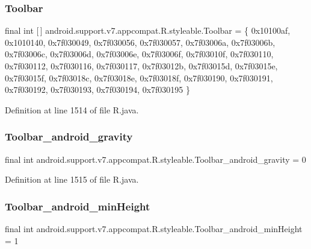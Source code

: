 \subsubsection{\texorpdfstring{Toolbar}{Toolbar}}
{\footnotesize\ttfamily final int \mbox{[}$\,$\mbox{]} android.\+support.\+v7.\+appcompat.\+R.\+styleable.\+Toolbar = \{ 0x10100af, 0x1010140, 0x7f030049, 0x7f030056, 0x7f030057, 0x7f03006a, 0x7f03006b, 0x7f03006c, 0x7f03006d, 0x7f03006e, 0x7f03006f, 0x7f03010f, 0x7f030110, 0x7f030112, 0x7f030116, 0x7f030117, 0x7f03012b, 0x7f03015d, 0x7f03015e, 0x7f03015f, 0x7f03018c, 0x7f03018e, 0x7f03018f, 0x7f030190, 0x7f030191, 0x7f030192, 0x7f030193, 0x7f030194, 0x7f030195 \}\hspace{0.3cm}{\ttfamily [static]}}



Definition at line 1514 of file R.\+java.

\mbox{\label{classandroid_1_1support_1_1v7_1_1appcompat_1_1_r_1_1styleable_a84a79bd8c687a1eef63dda96bb410f01}} 
\subsubsection{\texorpdfstring{Toolbar\_android\_gravity}{Toolbar\_android\_gravity}}
{\footnotesize\ttfamily final int android.\+support.\+v7.\+appcompat.\+R.\+styleable.\+Toolbar\+\_\+android\+\_\+gravity = 0\hspace{0.3cm}{\ttfamily [static]}}



Definition at line 1515 of file R.\+java.

\mbox{\label{classandroid_1_1support_1_1v7_1_1appcompat_1_1_r_1_1styleable_a3b8399b2cca0ff98749346ebd5d6bf70}} 
\subsubsection{\texorpdfstring{Toolbar\_android\_minHeight}{Toolbar\_android\_minHeight}}
{\footnotesize\ttfamily final int android.\+support.\+v7.\+appcompat.\+R.\+styleable.\+Toolbar\+\_\+android\+\_\+min\+Height = 1\hspace{0.3cm}{\ttfamily [static]}}



